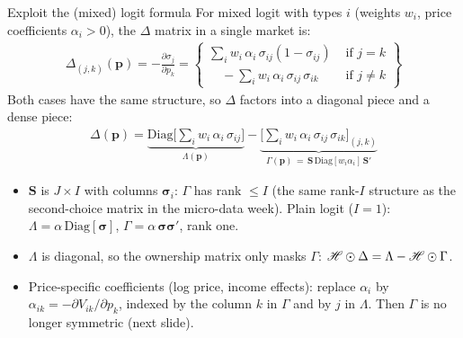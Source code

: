 \documentclass[aspectratio=169,10pt]{beamer}
\begin{document}
\begin{frame}{Exploit the (mixed) logit formula}
For mixed logit with types $i$ (weights $w_i$, price coefficients $\alpha_i > 0$), the $\Delta$ matrix in a single market is:
\begin{align*}
\Delta_{(j,k)}(\symbf{p}) = -\frac{\partial \sigma_j}{\partial p_k} = \left\{\begin{array}{lr}
       \sum_i w_i\, \alpha_i \, \sigma_{ij} (1-\sigma_{ij}) & \text{ if } j=k \\
       	  \quad -\sum_i w_i\, \alpha_i \, \sigma_{ij} \, \sigma_{ik} &  \text{ if }  j\neq k
        \end{array} \right\}
\end{align*}
Both cases have the same structure, so $\Delta$ factors into a diagonal piece and a dense piece:
\begin{align*}
\Delta(\symbf{p}) =  \underbrace{\text{Diag}\Big[ \sum_i w_i\, \alpha_i\, \sigma_{ij} \Big]}_{\Lambda(\symbf{p})} -  \underbrace{\Big[\sum_i w_i\, \alpha_i\, \sigma_{ij}\, \sigma_{ik} \Big]_{(j,k)}}_{\Gamma(\symbf{p}) \,=\, \symbf{S}\, \text{Diag}[w_i \alpha_i]\, \symbf{S}'}
\end{align*}
\begin{itemize}
\item $\symbf{S}$ is $J \times I$ with columns $\symbf{\sigma}_i$: $\Gamma$ has \alert{rank $\leq I$} (the same rank-$I$ structure as the second-choice matrix in the micro-data week). Plain logit ($I=1$): $\Lambda = \alpha\, \text{Diag}[\symbf{\sigma}]$, $\Gamma = \alpha\, \symbf{\sigma} \symbf{\sigma}'$, rank one.
\item $\Lambda$ is diagonal, so the ownership matrix only masks $\Gamma$: $\mathscr{H} \odot \Delta = \Lambda - \mathscr{H} \odot \Gamma$.
\item Price-specific coefficients (log price, income effects): replace $\alpha_i$ by $\alpha_{ik} = -\partial V_{ik}/\partial p_k$, indexed by the \alert{column} $k$ in $\Gamma$ and by $j$ in $\Lambda$. Then $\Gamma$ is \alert{no longer symmetric} (next slide).
\end{itemize}
\end{frame}
\end{document}
